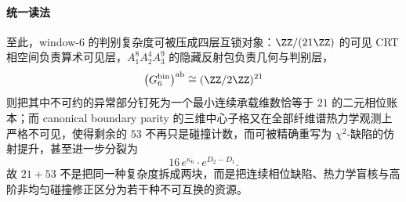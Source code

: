 \paragraph{统一读法}
至此，window-\(6\) 的判别复杂度可被压成四层互锁对象：\(\ZZ/(21\ZZ)\) 的可见 CRT 相空间负责算术可见层，\(A_1^8A_2^4A_3^9\) 的隐藏反射包负责几何与判别层，
\[
\bigl(G_6^{\mathrm{bin}}\bigr)^{\mathrm{ab}}\cong (\ZZ/2\ZZ)^{21}
\]
则把其中不可约的异常部分钉死为一个最小连续承载维数恰等于 \(21\) 的二元相位账本；而 canonical boundary parity 的三维中心子格又在全部纤维谱热力学观测上严格不可见，使得剩余的 \(53\) 不再只是碰撞计数，而可被精确重写为 \(\chi^2\)-缺陷的仿射提升，甚至进一步分裂为
\[
16\,e^{\kappa_6}\cdot e^{D_2-D_1}.
\]
故 \(21+53\) 不是把同一种复杂度拆成两块，而是把连续相位缺陷、热力学盲核与高阶非均匀碰撞修正区分为若干种不可互换的资源。

\endinput
